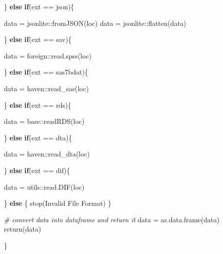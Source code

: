 \documentclass[
]{article}
\newenvironment{Shaded}{\begin{snugshade}}{\end{snugshade}}
\newcommand{\CommentTok}[1]{\textcolor[rgb]{0.56,0.35,0.01}{\textit{#1}}}
\newcommand{\ControlFlowTok}[1]{\textcolor[rgb]{0.13,0.29,0.53}{\textbf{#1}}}
\newcommand{\FunctionTok}[1]{\textcolor[rgb]{0.00,0.00,0.00}{#1}}
\newcommand{\NormalTok}[1]{#1}
\newcommand{\OtherTok}[1]{\textcolor[rgb]{0.56,0.35,0.01}{#1}}
\newcommand{\SpecialCharTok}[1]{\textcolor[rgb]{0.00,0.00,0.00}{#1}}
\newcommand{\StringTok}[1]{\textcolor[rgb]{0.31,0.60,0.02}{#1}}
\begin{document}
\begin{Shaded}
\begin{Highlighting}[]
\NormalTok{  \} }\ControlFlowTok{else} \ControlFlowTok{if}\NormalTok{(ext }\SpecialCharTok{==} \StringTok{\textquotesingle{}json\textquotesingle{}}\NormalTok{)\{}
    
\NormalTok{    data }\OtherTok{=}\NormalTok{ jsonlite}\SpecialCharTok{::}\FunctionTok{fromJSON}\NormalTok{(loc)}
\NormalTok{    data }\OtherTok{=}\NormalTok{ jsonlite}\SpecialCharTok{::}\FunctionTok{flatten}\NormalTok{(data)}
    
\NormalTok{  \} }\ControlFlowTok{else} \ControlFlowTok{if}\NormalTok{(ext }\SpecialCharTok{==} \StringTok{\textquotesingle{}sav\textquotesingle{}}\NormalTok{)\{}
    
\NormalTok{    data }\OtherTok{=}\NormalTok{ foreign}\SpecialCharTok{::}\FunctionTok{read.spss}\NormalTok{(loc)}
    
\NormalTok{  \} }\ControlFlowTok{else} \ControlFlowTok{if}\NormalTok{(ext }\SpecialCharTok{==} \StringTok{\textquotesingle{}sas7bdat\textquotesingle{}}\NormalTok{)\{}
    
\NormalTok{    data }\OtherTok{=}\NormalTok{ haven}\SpecialCharTok{::}\FunctionTok{read\_sas}\NormalTok{(loc)}
    
\NormalTok{  \} }\ControlFlowTok{else} \ControlFlowTok{if}\NormalTok{(ext }\SpecialCharTok{==} \StringTok{\textquotesingle{}rds\textquotesingle{}}\NormalTok{)\{}
    
\NormalTok{    data }\OtherTok{=}\NormalTok{ base}\SpecialCharTok{::}\FunctionTok{readRDS}\NormalTok{(loc)}
    
\NormalTok{  \} }\ControlFlowTok{else} \ControlFlowTok{if}\NormalTok{(ext }\SpecialCharTok{==} \StringTok{\textquotesingle{}dta\textquotesingle{}}\NormalTok{)\{}
    
\NormalTok{    data }\OtherTok{=}\NormalTok{ haven}\SpecialCharTok{::}\FunctionTok{read\_dta}\NormalTok{(loc)}
    
\NormalTok{  \} }\ControlFlowTok{else} \ControlFlowTok{if}\NormalTok{(ext }\SpecialCharTok{==} \StringTok{\textquotesingle{}dif\textquotesingle{}}\NormalTok{)\{}
    
\NormalTok{    data }\OtherTok{=}\NormalTok{ utils}\SpecialCharTok{::}\FunctionTok{read.DIF}\NormalTok{(loc)}
    
\NormalTok{  \} }\ControlFlowTok{else}\NormalTok{ \{}
    \FunctionTok{stop}\NormalTok{(}\StringTok{\textquotesingle{}Invalid File Format\textquotesingle{}}\NormalTok{)}
\NormalTok{  \}}
  
  \CommentTok{\# convert data into dataframe and return it}
\NormalTok{  data }\OtherTok{=} \FunctionTok{as.data.frame}\NormalTok{(data)}
  \FunctionTok{return}\NormalTok{(data)}
  
\NormalTok{\}}
\end{Highlighting}
\end{Shaded}
\end{document}
